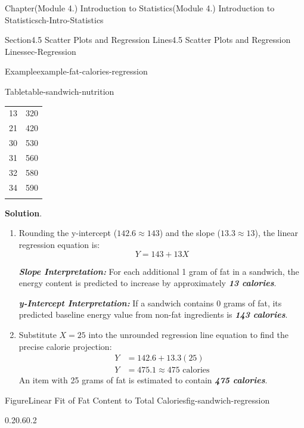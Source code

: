 \documentclass[oneside,10pt,]{book}
\newcommand{\blocktitlefont}{\relax}
\newcommand{\alert}[1]{\textbf{\textit{#1}}}
\newcommand{\hrulethin}  {\noalign{\hrule height 0.04em}}
\newcommand{\amp}{&}
\begin{document}
\begin{chapterptx}{Chapter}{(Module 4.) Introduction to Statistics}{}{(Module 4.) Introduction to Statistics}{}{}{ch-Intro-Statistics}
\begin{sectionptx}{Section}{4.5 Scatter Plots and Regression Lines}{}{4.5 Scatter Plots and Regression Lines}{}{}{sec-Regression}
\begin{example}{Example}{}{example-fat-calories-regression}
\begin{tableptx}{Table}{\textbf{}}{table-sandwich-nutrition}{}
{\begin{tabular}{cc}
13&320\tabularnewline\hrulethin
21&420\tabularnewline\hrulethin
30&530\tabularnewline\hrulethin
31&560\tabularnewline\hrulethin
32&580\tabularnewline\hrulethin
34&590\tabularnewline\hrulethin
\end{tabular}
}%
\end{tableptx}%
\par\smallskip%
\noindent\textbf{\blocktitlefont Solution}.\hypertarget{example-fat-calories-regression-2}{}\quad{}%
\begin{enumerate}[label={\alph*}]
\item{}Rounding the y-intercept (\(142.6 \approx 143\)) and the slope (\(13.3 \approx 13\)), the linear regression equation is:%
\begin{equation*}
Y = 143 + 13X
\end{equation*}
%
\par
\alert{Slope Interpretation:} For each additional 1 gram of fat in a sandwich, the energy content is predicted to increase by approximately \alert{13 calories}.%
\par
\alert{y-Intercept Interpretation:} If a sandwich contains 0 grams of fat, its predicted baseline energy value from non-fat ingredients is \alert{143 calories}.%
\item{}Substitute \(X = 25\) into the unrounded regression line equation to find the precise calorie projection:%
\begin{align*}
Y \amp= 142.6 + 13.3(25)\\
Y \amp= 475.1 \approx 475 \text{ calories}
\end{align*}
An item with 25 grams of fat is estimated to contain \alert{475 calories}.%
\end{enumerate}
%
\begin{figureptx}{Figure}{Linear Fit of Fat Content to Total Calories}{fig-sandwich-regression}{}%
\begin{image}{0.2}{0.6}{0.2}{}%
%
\end{image}%

\end{figureptx}
\end{example}
\end{sectionptx}
\end{chapterptx}
\end{document}
